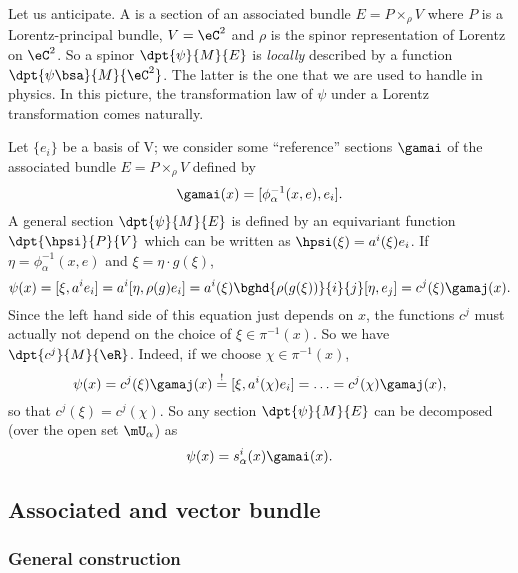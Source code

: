 Let us anticipate. A  is a section of an associated bundle $E=P\times_{\rho} V$ where $P$ is a Lorentz-principal bundle, $V=\eC^2$ and $\rho$ is the spinor representation of Lorentz on $\eC^2$. So a spinor $\dpt{\psi}{M}{E}$ is \emph{locally} described by a function $\dpt{\psi\bsa}{M}{\eC^2}$. The latter is the one that we are used to handle in physics. In this picture, the transformation law of $\psi$ under a Lorentz transformation comes naturally.

Let $\{e_i\}$ be a basis of V; we consider some ``reference'' sections $\gamai$ of the associated bundle $E=P\times_{\rho} V$ defined by
\begin{equation}\label{eq:def:gamai}
	\gamai(x)=[\phi_{\alpha}^{-1}(x,e),e_i].
\end{equation}
A general section $\dpt{\psi}{M}{E}$ is defined by an equivariant function $\dpt{\hpsi}{P}{V}$ which can be written as $\hpsi(\xi)=a^i(\xi)e_i$. If $\eta=\phi_{\alpha}^{-1}(x,e)$ and $\xi=\eta\cdot g(\xi)$,
\begin{equation}
	\psi(x)=[\xi,a^ie_i]
	=a^i[\eta,\rho(g)e_i]
	=a^i(\xi)\bghd{\rho(g(\xi))}{i}{j}[\eta,e_j]
	=c^j(\xi)\gamaj(x).
\end{equation}
Since the left hand side of this equation just depends on $x$, the functions $c^j$ must actually not depend on the choice of $\xi\in\pi^{-1}(x)$. So we have $\dpt{c^j}{M}{\eR}$. Indeed, if we choose $\chi\in\pi^{-1}(x)$,
\[
	\psi(x)=c^j(\xi)\gamaj(x)
	\stackrel{!}{=}[\xi,a^{i}(\chi)e_i]
	=\ldots
	=c^j(\chi)\gamaj(x),
\]
so that $c^j(\xi)=c^j(\chi)$. So any section $\dpt{\psi}{M}{E}$ can be decomposed (over the open set $\mU_{\alpha}$) as
\begin{equation}
	\psi(x)=s_{\alpha}^i(x)\gamai(x).
\end{equation}


\subsection{Associated and vector bundle}

\subsubsection{General construction}

